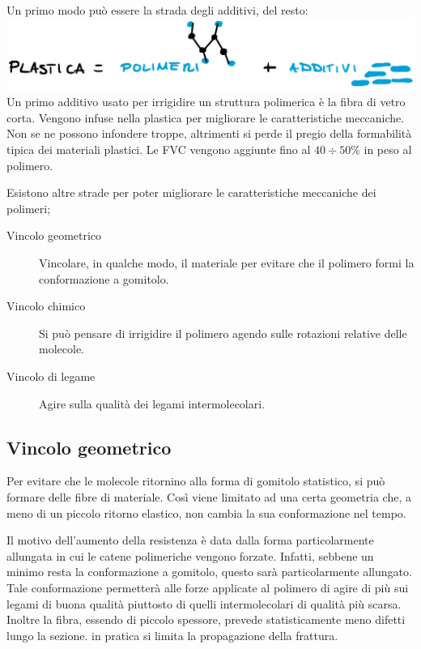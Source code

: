 Un primo modo può essere la strada degli additivi, del resto:\\
\includegraphics[width = \textwidth]{gfx/Plastica}\\
Un primo additivo usato per irrigidire un struttura polimerica è la fibra di vetro corta.
Vengono infuse nella plastica per migliorare le caratteristiche meccaniche.
Non se ne possono infondere troppe, altrimenti si perde il pregio della formabilità tipica dei materiali plastici.
Le \ac{FVC} vengono aggiunte fino al $40 \div 50\%$ in peso al polimero.

Esistono altre strade per poter migliorare le caratteristiche meccaniche dei polimeri;
\begin{description}
\item[Vincolo geometrico] Vincolare, in qualche modo, il materiale per evitare che il polimero formi la conformazione a gomitolo.
\item[Vincolo chimico] Si può pensare di irrigidire il polimero agendo sulle rotazioni relative delle molecole.
\item[Vincolo di legame] Agire sulla qualità dei legami intermolecolari.
\end{description}

\subsection{Vincolo geometrico}
Per evitare che le molecole ritornino alla forma di gomitolo statistico, si può formare delle fibre di materiale. Così viene limitato ad una certa geometria che, a meno di un piccolo ritorno elastico, non cambia la sua conformazione nel tempo.

Il motivo dell'aumento della resistenza è data dalla forma particolarmente allungata in cui le catene polimeriche vengono forzate.
Infatti, sebbene un minimo resta la conformazione a gomitolo, questo sarà particolarmente allungato. Tale conformazione permetterà alle forze applicate al polimero di agire di più sui legami di buona qualità piuttosto di quelli intermolecolari di qualità più scarsa.
Inoltre la fibra, essendo di piccolo spessore, prevede statisticamente meno difetti lungo la sezione. in pratica si limita la propagazione della frattura.

